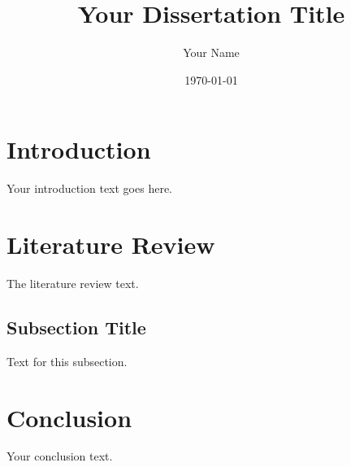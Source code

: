 \documentclass[12pt]{article} %
\title{Your Dissertation Title}
\author{Your Name}
\date{\today} %
\begin{document}
    \maketitle

    \section{Introduction}
    Your introduction text goes here.

    \section{Literature Review}
    The literature review text.

    \subsection{Subsection Title}
    Text for this subsection.


    \section{Conclusion}
    Your conclusion text.

    \printbibliography
\end{document}
